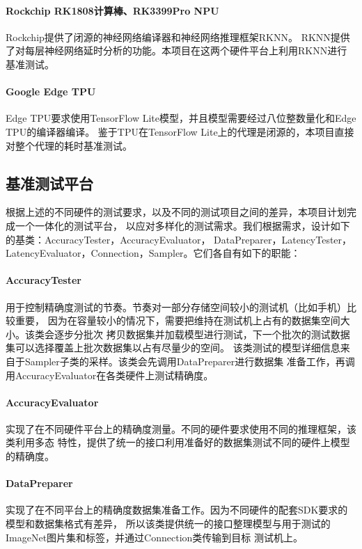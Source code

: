 \paragraph{Rockchip RK1808计算棒、RK3399Pro NPU}
Rockchip提供了闭源的神经网络编译器和神经网络推理框架RKNN。
RKNN提供了对每层神经网络延时分析的功能。本项目在这两个硬件平台上利用RKNN进行基准测试。

\paragraph{Google Edge TPU}
Edge TPU要求使用TensorFlow Lite模型，并且模型需要经过八位整数量化和Edge TPU的编译器编译。
鉴于TPU在TensorFlow Lite上的代理是闭源的，本项目直接对整个代理的耗时基准测试。

\subsection{基准测试平台}
根据上述的不同硬件的测试要求，以及不同的测试项目之间的差异，本项目计划完成一个一体化的测试平台，
以应对多样化的测试需求。我们根据需求，设计如下的基类：AccuracyTester，AccuracyEvaluator，
DataPreparer，LatencyTester，LatencyEvaluator，Connection，Sampler。它们各自有如下的职能：

\paragraph{AccuracyTester}
用于控制精确度测试的节奏。节奏对一部分存储空间较小的测试机（比如手机）比较重要，
因为在容量较小的情况下，需要把维持在测试机上占有的数据集空间大小。该类会逐步分批次
拷贝数据集并加载模型进行测试，下一个批次的测试数据集可以选择覆盖上批次数据集以占有尽量少的空间。
该类测试的模型详细信息来自于Sampler子类的采样。该类会先调用DataPreparer进行数据集
准备工作，再调用AccuracyEvaluator在各类硬件上测试精确度。

\paragraph{AccuracyEvaluator}
实现了在不同硬件平台上的精确度测量。不同的硬件要求使用不同的推理框架，该类利用多态
特性，提供了统一的接口利用准备好的数据集测试不同的硬件上模型的精确度。

\paragraph{DataPreparer}
实现了在不同平台上的精确度数据集准备工作。因为不同硬件的配套SDK要求的模型和数据集格式有差异，
所以该类提供统一的接口整理模型与用于测试的ImageNet图片集和标签，并通过Connection类传输到目标
测试机上。

